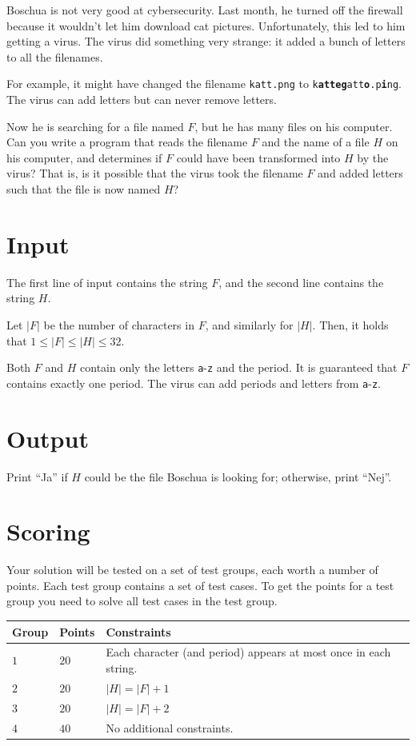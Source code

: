 
Boschua is not very good at cybersecurity. Last month, he turned off the firewall because it wouldn't
let him download cat pictures. Unfortunately, this led to him getting a virus. The virus did something
very strange: it added a bunch of letters to all the filenames.

For example, it might have changed the filename \texttt{katt.png} to \texttt{k\textbf{atteg}att\textbf{o}.p\textbf{i}ng}.
The virus can add letters but can never remove letters.

Now he is searching for a file named $F$, but he has many files on his computer. Can you write a
program that reads the filename $F$ and the name of a file $H$ on his computer, and determines if
$F$ could have been transformed into $H$ by the virus? That is, is it possible that the virus took
the filename $F$ and added letters such that the file is now named $H$?

\section*{Input}
The first line of input contains the string $F$, and the second line contains the string $H$.

Let $|F|$ be the number of characters in $F$, and similarly for $|H|$.
Then, it holds that $1 \le |F| \le |H| \le 32$.

Both $F$ and $H$ contain only the letters \texttt{a}-\texttt{z} and the period.
It is guaranteed that $F$ contains exactly one period. The virus can add periods and letters from \texttt{a}-\texttt{z}.

\section*{Output}  
Print ``Ja'' if $H$ could be the file Boschua is looking for; otherwise, print ``Nej''.

\section*{Scoring}
Your solution will be tested on a set of test groups, each worth a number of points. Each test group contains
a set of test cases. To get the points for a test group you need to solve all test cases in the test group.

\noindent
\begin{tabular}{| l | l | p{12cm} |}
  \hline
  \textbf{Group} & \textbf{Points} & \textbf{Constraints} \\ \hline
  $1$ & $20$ & Each character (and period) appears at most once in each string. \\ \hline
  $2$ & $20$ & $|H| = |F|+1$ \\ \hline
  $3$ & $20$ & $|H| = |F|+2$ \\ \hline
  $4$ & $40$ & No additional constraints. \\ \hline
\end{tabular}

